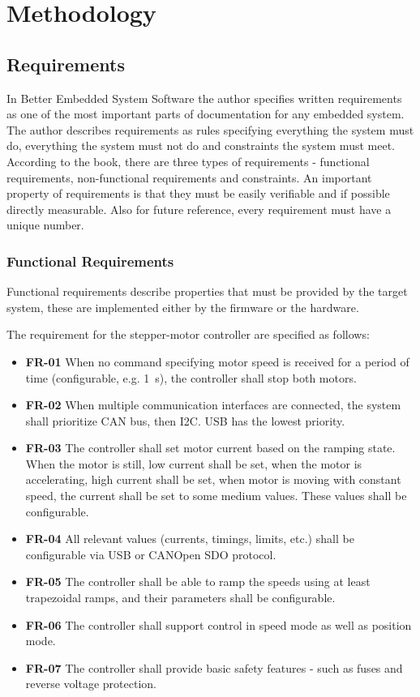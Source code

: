 \chapter{Methodology}
\label{ch:methods}

\section{Requirements}
\label{sec:requirements}
In Better Embedded System Software\cite{phillip_koopman_better_2010} the author specifies written requirements as one of the most important parts of documentation for any embedded system.
The author describes requirements as rules specifying everything the system must do, everything the system must not do and constraints the system must meet.
According to the book, there are three types of requirements - functional requirements, non-functional requirements and constraints.
An important property of requirements is that they must be easily verifiable and if possible directly measurable.
Also for future reference, every requirement must have a unique number.

\subsection{Functional Requirements}
\label{subsec:func_req}
Functional requirements describe properties that must be provided by the target system, these are implemented either by the firmware or the hardware.

The requirement for the stepper-motor controller are specified as follows:

\begin{itemize}
    \item \textbf{FR-01} When no command specifying motor speed is received for a period of time (configurable, e.g. 1~s), the controller shall stop both motors.
    \item \textbf{FR-02} When multiple communication interfaces are connected, the system shall prioritize CAN bus, then I2C. USB has the lowest priority.
    \item \textbf{FR-03} The controller shall set motor current based on the ramping state.
    When the motor is still, low current shall be set, when the motor is accelerating, high current shall be set, when motor is moving with constant speed, the current shall be set to some medium values.
    These values shall be configurable.
    \item \textbf{FR-04} All relevant values (currents, timings, limits, etc.) shall be configurable via USB or CANOpen SDO protocol.
    \item \textbf{FR-05} The controller shall be able to ramp the speeds using at least trapezoidal ramps, and their parameters shall be configurable.
    \item \textbf{FR-06} The controller shall support control in speed mode as well as position mode.
    \item \textbf{FR-07} The controller shall provide basic safety features - such as fuses and reverse voltage protection.
\end{itemize}

